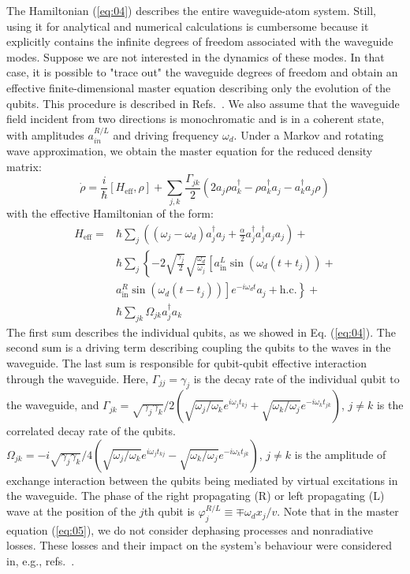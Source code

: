 \documentclass[lettersize,journal]{IEEEtran}
\begin{document}
The Hamiltonian (\ref{eq:04}) describes the entire waveguide-atom system. Still, using it for analytical and numerical calculations is cumbersome because it explicitly contains the infinite degrees of freedom associated with the waveguide modes.
Suppose we are not interested in the dynamics of these modes. 
In that case, it is possible to "trace out" the waveguide degrees of freedom and obtain an effective finite-dimensional master equation describing only the evolution of the qubits. 
This procedure is described in Refs.~\cite{gardiner2004quantum,lehmberg_radiation_1970,lalumiere_input-output_2013}. 
We also assume that the waveguide field incident from two directions is monochromatic and is in a coherent state, with amplitudes $a_{in}^{R/L}$ and driving frequency $\omega_d$. 
Under a Markov and rotating wave approximation, we obtain the master equation for the reduced density matrix:
\begin{equation} \label{eq:05}
    \dot{\rho} = \frac{i}{\hbar} \left[ H_\mathrm{eff}, \rho \right] + \sum_{j,k} \frac{\Gamma_{jk}}{2} \left( 2 a_j \rho a_k^\dag - \rho a_k^\dag a_j - a_k^\dag a_j \rho \right)
\end{equation}
with the effective Hamiltonian of the form:
\begin{align} \label{eq:06}
    H_\mathrm{eff} =& \hbar \sum_j \left( (\omega_j - \omega_d) a_j^\dag a_j + \frac{\alpha}{2} a_j^\dag a_j^\dag a_j a_j \right) + \nonumber \\
    &\hbar \sum_j \left\{ -2 \sqrt{\frac{\gamma_j}{2}} \sqrt{\frac{\omega_d}{\omega_j}} \left[ a_\mathrm{in}^L \sin(\omega_d (t + t_j)) + \right.\right.\\
    &\left.\left.a_\mathrm{in}^R \sin(\omega_d (t - t_j)) \right] e^{-i \omega_d t} a_j + \mathrm{h.c.} \right\} + \nonumber \\
    &\hbar \sum_{jk} \Omega_{jk} a_j^\dag a_k \nonumber
\end{align}
The first sum describes the individual qubits, as we showed in Eq. (\ref{eq:04}).
The second sum is a driving term describing coupling the qubits to the waves in the waveguide.
The last sum is responsible for qubit-qubit effective interaction through the waveguide.
Here, $\Gamma_{jj} = \gamma_j$ is the decay rate of the individual qubit to the waveguide, and $\Gamma_{jk} = \sqrt{\gamma_j \gamma_k}/2 \left( \sqrt{\omega_j / \omega_k} e^{i \omega_j t_{kj}} +  \sqrt{\omega_k / \omega_j} e^{-i \omega_k t_{jk}}\right)$, $j\neq k$ is the correlated decay rate of the qubits.
$\Omega_{jk} = -i\sqrt{\gamma_j \gamma_k}/4 \left( \sqrt{\omega_j / \omega_k} e^{i \omega_j t_{kj}} -  \sqrt{\omega_k / \omega_j} e^{-i \omega_k t_{jk}} \right)$, $j\neq k$ is the amplitude of exchange interaction between the qubits being mediated by virtual excitations in the waveguide.
The phase of the right propagating (R) or left propagating (L) wave at the position of the $j$th qubit is $\varphi_j^{R/L} \equiv \mp \omega_d x_j / v$.
Note that in the master equation (\ref{eq:05}), we do not consider dephasing processes and nonradiative losses. 
These losses and their impact on the system's behaviour were considered in, e.g., refs.~\cite{rosario_hamann_rectangular_2019, Nefedkin2022}.
\end{document}
